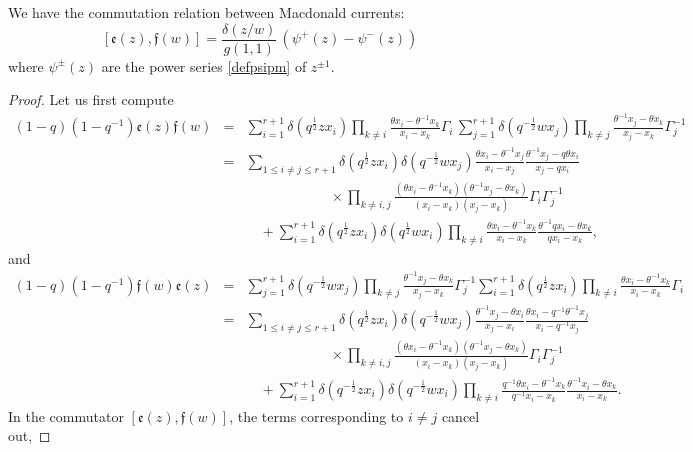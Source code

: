 \begin{thm}\label{commuef}
We have the commutation relation between Macdonald currents:
$$[{\mathfrak e}(z),{\mathfrak f}(w)]=\frac{\delta(z/w)}{g(1,1)}\, (\psi^+(z)-\psi^-(z))$$
where $\psi^\pm(z)$ are the power series \eqref{defpsipm} of $z^{\pm 1}$.
\end{thm}
\begin{proof}
Let us first compute
\begin{eqnarray*}
(1-q)(1-q^{-1}){\mathfrak e}(z){\mathfrak f}(w)&=& 
\sum_{i=1}^{r+1} \delta(q^{\frac{1}{2}}z x_i)\prod_{k\neq i}\frac{\theta x_i-\theta^{-1}x_k}{x_i-x_k}\Gamma_i \,
\sum_{j=1}^{r+1} \delta(q^{-\frac{1}{2}}w x_j)\prod_{k\neq j}\frac{\theta^{-1} x_j-\theta x_k}{x_j-x_k}\Gamma_j^{-1}\\
&=&\sum_{1\leq i\neq j\leq r+1} \delta(q^{\frac{1}{2}}z x_i)\delta(q^{-\frac{1}{2}}w x_j)\frac{\theta x_i-\theta^{-1}x_j}{x_i-x_j}
\frac{\theta^{-1} x_j-q\theta x_i}{x_j-qx_i}\\
&&\qquad\qquad\qquad \times \prod_{k\neq i,j} \frac{(\theta x_i-\theta^{-1}x_k)(\theta^{-1} x_j-\theta x_k)}{(x_i-x_k)(x_j-x_k)}\Gamma_i\Gamma_j^{-1}\\
&&\quad +\sum_{i=1}^{r+1} \delta(q^{\frac{1}{2}}z x_i)\delta(q^{\frac{1}{2}} w x_i)\prod_{k\neq i}\frac{\theta x_i-\theta^{-1}x_k}{x_i-x_k}\frac{\theta^{-1} q x_i-\theta x_k}{q x_i-x_k},
\end{eqnarray*}
and
\begin{eqnarray*}
(1-q)(1-q^{-1}){\mathfrak f}(w){\mathfrak e}(z)&=& \sum_{j=1}^{r+1} \delta(q^{-\frac{1}{2}}w x_j)\prod_{k\neq j}\frac{\theta^{-1} x_j-\theta x_k}{x_j-x_k}\Gamma_j^{-1}\sum_{i=1}^{r+1} \delta(q^{\frac{1}{2}}z x_i)\prod_{k\neq i}\frac{\theta x_i-\theta^{-1}x_k}{x_i-x_k}\Gamma_i\\
&=&\sum_{1\leq i\neq j\leq r+1} \delta(q^{\frac{1}{2}}z x_i)\delta(q^{-\frac{1}{2}}w x_j)\frac{\theta^{-1} x_j-\theta x_i}{x_j-x_i}\frac{\theta x_i-q^{-1}\theta^{-1}x_j}{x_i-q^{-1}x_j}\\
&&\qquad\qquad\qquad \times 
\prod_{k\neq i,j} \frac{(\theta x_i-\theta^{-1}x_k)(\theta^{-1} x_j-\theta x_k)}{(x_i-x_k)(x_j-x_k)}\Gamma_i\Gamma_j^{-1}\\
&&\quad +\sum_{i=1}^{r+1} \delta(q^{-\frac{1}{2}}z x_i)\delta(q^{-\frac{1}{2}}w x_i)\prod_{k\neq i}\frac{q^{-1}\theta x_i-\theta^{-1}x_k}{q^{-1}x_i-x_k}\frac{\theta^{-1} x_i-\theta x_k}{x_i-x_k}.
\end{eqnarray*}
In the commutator $[{\mathfrak e}(z),{\mathfrak f}(w)]$, the terms corresponding to $i\neq j$ cancel out, 

\end{proof}

